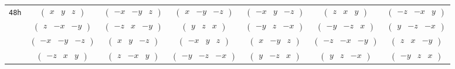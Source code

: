 \documentclass[fleqn,9pt,landscape]{jsarticle}
\begin{document}
\begin{center}
\begin{longtable}{ccccccc}
{\tt 48h} & $ \begin{pmatrix} x & y & z \end{pmatrix} $ & $ \begin{pmatrix} - x & - y & z \end{pmatrix} $ & $ \begin{pmatrix} x & - y & - z \end{pmatrix} $ & $ \begin{pmatrix} - x & y & - z \end{pmatrix} $ & $ \begin{pmatrix} z & x & y \end{pmatrix} $ & $ \begin{pmatrix} - z & - x & y \end{pmatrix} $ \\
& $ \begin{pmatrix} z & - x & - y \end{pmatrix} $ & $ \begin{pmatrix} - z & x & - y \end{pmatrix} $ & $ \begin{pmatrix} y & z & x \end{pmatrix} $ & $ \begin{pmatrix} - y & z & - x \end{pmatrix} $ & $ \begin{pmatrix} - y & - z & x \end{pmatrix} $ & $ \begin{pmatrix} y & - z & - x \end{pmatrix} $ \\
& $ \begin{pmatrix} - x & - y & - z \end{pmatrix} $ & $ \begin{pmatrix} x & y & - z \end{pmatrix} $ & $ \begin{pmatrix} - x & y & z \end{pmatrix} $ & $ \begin{pmatrix} x & - y & z \end{pmatrix} $ & $ \begin{pmatrix} - z & - x & - y \end{pmatrix} $ & $ \begin{pmatrix} z & x & - y \end{pmatrix} $ \\
& $ \begin{pmatrix} - z & x & y \end{pmatrix} $ & $ \begin{pmatrix} z & - x & y \end{pmatrix} $ & $ \begin{pmatrix} - y & - z & - x \end{pmatrix} $ & $ \begin{pmatrix} y & - z & x \end{pmatrix} $ & $ \begin{pmatrix} y & z & - x \end{pmatrix} $ & $ \begin{pmatrix} - y & z & x \end{pmatrix} $ \\

\end{longtable}
\end{center}
\end{document}
